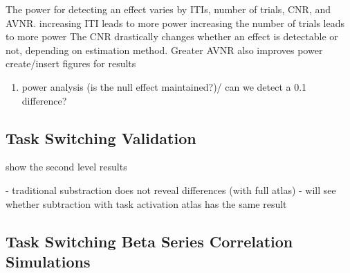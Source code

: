 \documentclass[10pt,letterpaper]{article}
\begin{document}
The power for detecting an effect varies by ITIs, number of trials, CNR, and AVNR.
increasing ITI leads to more power
increasing the number of trials leads to more power
The CNR drastically changes whether an effect is detectable or not, depending on estimation method.
Greater AVNR also improves power
create/insert figures for results

\begin{enumerate}
  \item power analysis (is the null effect maintained?)/ can we detect a 0.1 difference?
\end{enumerate}

\subsection*{Task Switching Validation}
show the second level results

- traditional substraction does not reveal differences (with full atlas)
- will see whether subtraction with task activation atlas has the same result

\subsection*{Task Switching Beta Series Correlation Simulations}
\end{document}
